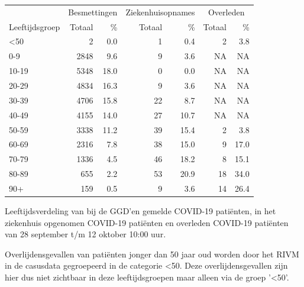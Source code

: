 \documentclass[
  english,
  man,floatsintext]{apa6}
\begin{document}
\begin{table}
\centering\begingroup\fontsize{11}{13}\selectfont

\begin{threeparttable}
\begin{tabular}{lrrrrrr}
\toprule
\multicolumn{1}{c}{ } & \multicolumn{2}{c}{Besmettingen} & \multicolumn{2}{c}{Ziekenhuisopnames} & \multicolumn{2}{c}{Overleden} \\
\cmidrule(l{3pt}r{3pt}){2-3} \cmidrule(l{3pt}r{3pt}){4-5} \cmidrule(l{3pt}r{3pt}){6-7}
Leeftijdsgroep & Totaal & \% & Totaal & \% & Totaal & \%\\
\midrule
<50 & 2 & 0.0 & 1 & 0.4 & 2 & 3.8\\
0-9 & 2848 & 9.6 & 9 & 3.6 & NA & NA\\
10-19 & 5348 & 18.0 & 0 & 0.0 & NA & NA\\
20-29 & 4834 & 16.3 & 9 & 3.6 & NA & NA\\
30-39 & 4706 & 15.8 & 22 & 8.7 & NA & NA\\
40-49 & 4155 & 14.0 & 27 & 10.7 & NA & NA\\
50-59 & 3338 & 11.2 & 39 & 15.4 & 2 & 3.8\\
60-69 & 2316 & 7.8 & 38 & 15.0 & 9 & 17.0\\
70-79 & 1336 & 4.5 & 46 & 18.2 & 8 & 15.1\\
80-89 & 655 & 2.2 & 53 & 20.9 & 18 & 34.0\\
90+ & 159 & 0.5 & 9 & 3.6 & 14 & 26.4\\
\bottomrule
\end{tabular}
\begin{tablenotes}
\item[1] Leeftijdsverdeling van bij de GGD’en gemelde COVID-19 patiënten, in het ziekenhuis opgenomen COVID-19 patiënten en overleden COVID-19 patiënten van 28 september t/m 12 oktober 10:00 uur.
\item[2] Overlijdensgevallen van patiënten jonger dan 50 jaar oud worden door het RIVM in de casusdata gegroepeerd in de categorie <50. Deze overlijdensgevallen zijn hier dus niet zichtbaar in deze leeftijdsgroepen maar alleen via de groep '<50'.
\end{tablenotes}
\end{threeparttable}
\endgroup{}
\end{table}

\newpage
\end{document}
